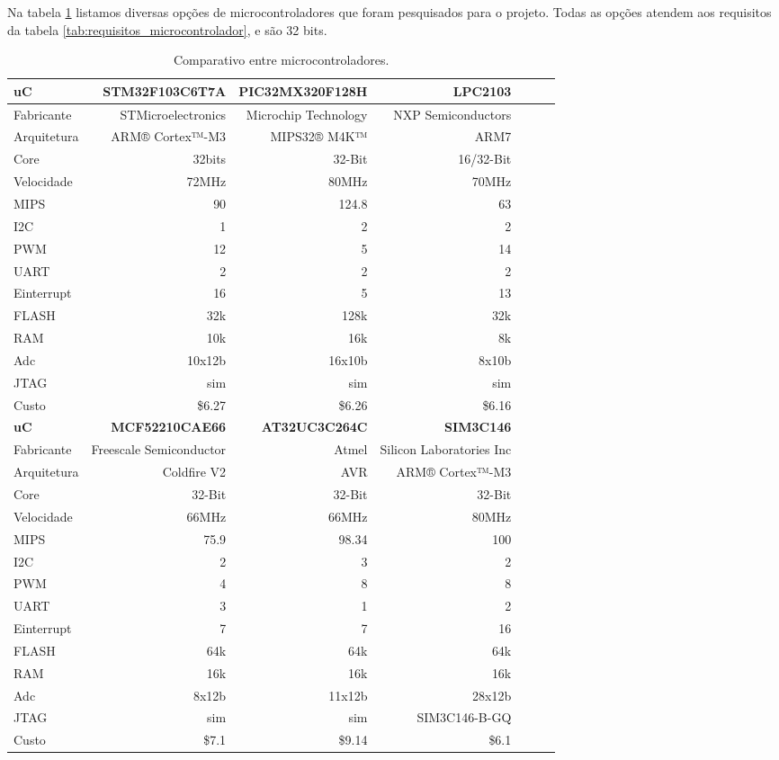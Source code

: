 Na tabela \ref{tab:alternativas_microcontrolador} listamos diversas opções de microcontroladores que foram pesquisados para o projeto. Todas as opções atendem aos requisitos da tabela \ref{tab:requisitos_microcontrolador}, e são 32 bits.

\begin{table}[h]
\caption{Comparativo entre microcontroladores.}
\centering
\begin{tabular}{l|rrrrrr}
\toprule
\textbf{uC} & \textbf{STM32F103C6T7A} & \textbf{PIC32MX320F128H} & \textbf{LPC2103} \\ \hline
Fabricante & STMicroelectronics & Microchip Technology & NXP Semiconductors \\ \hline
Arquitetura & ARM® Cortex™-M3 & MIPS32® M4K™ & ARM7 \\ \hline
Core & 32bits & 32-Bit & 16/32-Bit \\ \hline
Velocidade & 72MHz & 80MHz & 70MHz \\ \hline
MIPS & 90 & 124.8 & 63 \\ \hline
I2C & 1 & 2 & 2 \\ \hline
PWM & 12 & 5 & 14 \\ \hline
UART & 2 & 2 & 2 \\ \hline
Einterrupt & 16 & 5 & 13 \\ \hline
FLASH & 32k & 128k & 32k \\ \hline
RAM & 10k & 16k & 8k \\ \hline
Adc & 10x12b & 16x10b & 8x10b \\ \hline
JTAG & sim & sim & sim \\ \hline
Custo & \$6.27 & \$6.26 & \$6.16 \\
\toprule
\textbf{uC} & \textbf{MCF52210CAE66} & \textbf{AT32UC3C264C} & \textbf{SIM3C146} \\ \hline
Fabricante & Freescale Semiconductor & Atmel & Silicon Laboratories Inc \\ \hline
Arquitetura & Coldfire V2 & AVR & ARM® Cortex™-M3 \\ \hline
Core & 32-Bit & 32-Bit & 32-Bit \\ \hline
Velocidade & 66MHz & 66MHz & 80MHz \\ \hline
MIPS & 75.9 & 98.34 & 100 \\ \hline
I2C & 2 & 3 & 2 \\ \hline
PWM & 4 & 8 & 8 \\ \hline
UART & 3 & 1 & 2 \\ \hline
Einterrupt & 7 & 7 & 16 \\ \hline
FLASH & 64k & 64k & 64k \\ \hline
RAM & 16k & 16k & 16k \\ \hline
Adc & 8x12b & 11x12b & 28x12b \\ \hline
JTAG & sim & sim & SIM3C146-B-GQ \\ \hline
Custo & \$7.1 & \$9.14 & \$6.1 \\ \bottomrule
\end{tabular}
\label{tab:alternativas_microcontrolador}
\end{table}

